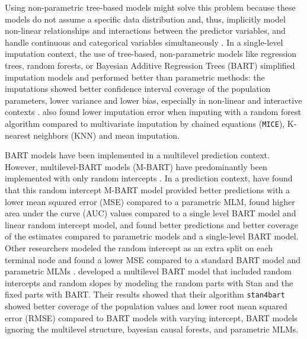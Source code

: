 \documentclass[10pt, a4paper, titlepage]{article}
\begin{document}
Using non-parametric tree-based models might solve this problem because these models do not assume a specific data distribution and, thus, implicitly model non-linear relationships and interactions between the predictor variables, and handle continuous and categorical variables simultaneously \citep{hill2020, burgette2010, lin2019, chipman2010, james2021, salditt2023, breiman1984}. In a single-level imputation context, the use of tree-based, non-parametric models like regression trees, random forests, or Bayesian Additive Regression Trees (BART) simplified imputation models and performed better than parametric methods: the imputations showed better confidence interval coverage of the population parameters, lower variance and lower bias, especially in non-linear and interactive contexts \citep{burgette2010, xu2016, silva2022}. \citet{waljee2013} also found lower imputation error when imputing with a random forest algorithm compared to multivariate imputation by chained equations (\texttt{MICE}), K-nearest neighbors (KNN) and mean imputation.

BART models have been implemented in a multilevel prediction context. However, multilevel-BART models (M-BART) have predominantly been implemented with only random intercepts \citep{chen2020, wagner2020, tan2016, wundervald2022}. In a prediction context, \citet{wagner2020} have found that this random intercept M-BART model provided better predictions with a lower mean squared error (MSE) compared to a parametric MLM, \citet{tan2016} found higher area under the curve (AUC) values compared to a single level BART model and linear random intercept model, and \citet{chen2020} found better predictions and better coverage of the estimates compared to parametric models and a single-level BART model. Other researchers modeled the random intercept as an extra split on each terminal node and found a lower MSE compared to a standard BART model and parametric MLMs \citep{wundervald2022}. \citet{dorie2022} developed a multilevel BART model that included random intercepts and random slopes by modeling the random parts with Stan \citep{lee2017} and the fixed parts with BART. Their results showed that their algorithm \texttt{stan4bart} showed better coverage of the population values and lower root mean squared error (RMSE) compared to BART models with varying intercept, BART models ignoring the multilevel structure, bayesian causal forests, and parametric MLMs.
\end{document}

